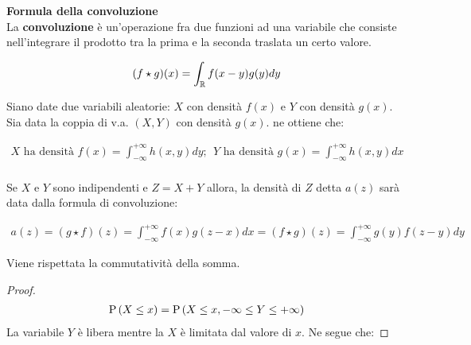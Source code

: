 \begin{defn}
    \textbf{Formula della convoluzione} \\
    La \textbf{convoluzione} è un'operazione fra due funzioni ad una variabile
    che consiste nell'integrare il prodotto tra la prima e la seconda traslata
    un certo valore.

    \begin{equation*}
        \begin{aligned}
            (f \star g)(x) = \int_{\mathbb{R}}f(x - y)g(y) dy
        \end{aligned}
    \end{equation*}

    Siano date due variabili aleatorie: $X$ con densità $f(x)$ e $Y$ con densità
    $g(x)$. Sia data la coppia di v.a. $(X, Y)$ con densità $g(x)$. ne ottiene
    che:

    \begin{equation*}
        \begin{aligned}
            X \text{ ha densità } f(x) = \int_{-\infty}^{+\infty} h(x,y) dy; \>\>
            Y \text{ ha densità } g(x) = \int_{-\infty}^{+\infty} h(x,y) dx \\
        \end{aligned}
    \end{equation*}

    Se $X$ e $Y$ sono indipendenti e $Z = X + Y$ allora, la densità di $Z$ detta
    $a(z)$ sarà data dalla formula di convoluzione:

    \begin{equation*}
        \begin{aligned}
            a(z) = (g \star f)(z) = \int_{-\infty}^{+\infty} f(x) g(z-x) dx = (f \star g)(z) = \int_{-\infty}^{+\infty} g(y) f(z-y) dy
        \end{aligned}
    \end{equation*}

    Viene rispettata la commutatività della somma.

    \begin{proof}
        \begin{equation*}
            \begin{aligned}
                \text{P}\left(X \leq x\right) = \text{P}\left(X \leq x, -\infty \leq Y \leq +\infty\right)
            \end{aligned}
        \end{equation*}
        La variabile $Y$ è libera mentre la $X$ è limitata dal valore di $x$. Ne
        segue che:


\end{proof}
\end{defn}
